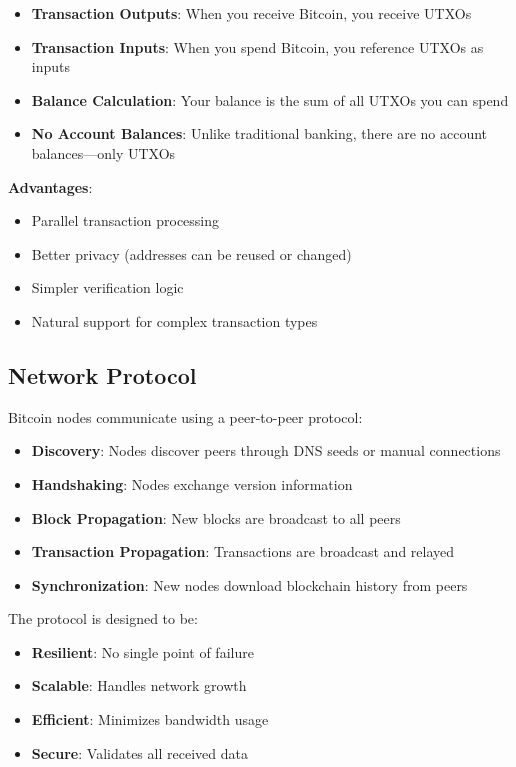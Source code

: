 \begin{itemize}
  \item \textbf{Transaction Outputs}: When you receive Bitcoin, you receive UTXOs
  \item \textbf{Transaction Inputs}: When you spend Bitcoin, you reference UTXOs as inputs
  \item \textbf{Balance Calculation}: Your balance is the sum of all UTXOs you can spend
  \item \textbf{No Account Balances}: Unlike traditional banking, there are no account balances---only UTXOs
\end{itemize}

\needspace{2in}
\textbf{Advantages}:
\begin{itemize}
  \item Parallel transaction processing
  \item Better privacy (addresses can be reused or changed)
  \item Simpler verification logic
  \item Natural support for complex transaction types
\end{itemize}

\subsection{Network Protocol}
\label{subsec:ch02-network-protocol}

Bitcoin nodes communicate using a peer-to-peer protocol:

\begin{itemize}
  \item \textbf{Discovery}: Nodes discover peers through DNS seeds or manual connections
  \item \textbf{Handshaking}: Nodes exchange version information
  \item \textbf{Block Propagation}: New blocks are broadcast to all peers
  \item \textbf{Transaction Propagation}: Transactions are broadcast and relayed
  \item \textbf{Synchronization}: New nodes download blockchain history from peers
\end{itemize}

The protocol is designed to be:
\begin{itemize}
  \item \textbf{Resilient}: No single point of failure
  \item \textbf{Scalable}: Handles network growth
  \item \textbf{Efficient}: Minimizes bandwidth usage
  \item \textbf{Secure}: Validates all received data
\end{itemize}

